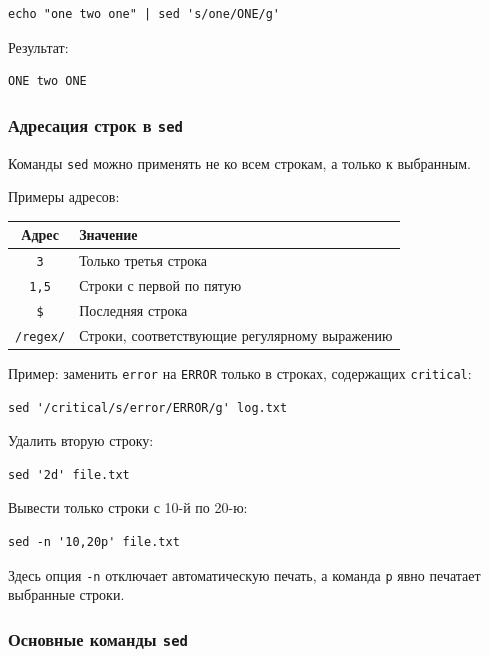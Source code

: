 \documentclass[12pt,a4paper]{article}
\begin{document}
\begin{verbatim}
echo "one two one" | sed 's/one/ONE/g'
\end{verbatim}

Результат:

\begin{verbatim}
ONE two ONE
\end{verbatim}

\subsubsection{Адресация строк в \texttt{sed}}

Команды \texttt{sed} можно применять не ко всем строкам, а только к выбранным.

Примеры адресов:

\begin{center}
\begin{tabular}{|c|p{9cm}|}
\hline
Адрес & Значение \\
\hline
\texttt{3} & Только третья строка \\
\hline
\texttt{1,5} & Строки с первой по пятую \\
\hline
\texttt{\$} & Последняя строка \\
\hline
\texttt{/regex/} & Строки, соответствующие регулярному выражению \\
\hline
\end{tabular}
\end{center}

Пример: заменить \texttt{error} на \texttt{ERROR} только в строках, содержащих \texttt{critical}:

\begin{verbatim}
sed '/critical/s/error/ERROR/g' log.txt
\end{verbatim}

Удалить вторую строку:

\begin{verbatim}
sed '2d' file.txt
\end{verbatim}

Вывести только строки с 10-й по 20-ю:

\begin{verbatim}
sed -n '10,20p' file.txt
\end{verbatim}

Здесь опция \texttt{-n} отключает автоматическую печать, а команда \texttt{p} явно печатает выбранные строки.

\subsubsection{Основные команды \texttt{sed}}
\end{document}
